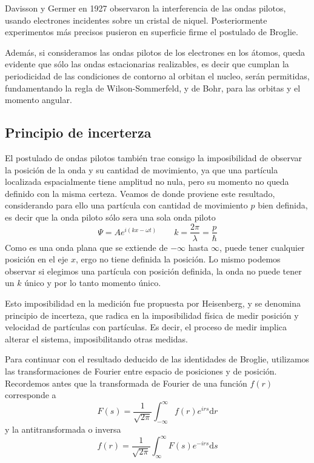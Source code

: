 Davisson y Germer en 1927 observaron la interferencia de las ondas pilotos, usando electrones incidentes sobre un cristal de niquel.
Posteriormente experimentos más precisos pusieron en superficie firme el postulado de Broglie.

Además, si consideramos las ondas pilotos de los electrones en los átomos, queda evidente que sólo las ondas estacionarias realizables, es decir que cumplan la periodicidad de las condiciones de contorno al orbitan el nucleo, serán permitidas, fundamentando la regla de Wilson-Sommerfeld, y de Bohr, para las orbitas y el momento angular.

\subsection{Principio de incerterza}
El postulado de ondas pilotos también trae consigo la imposibilidad de observar la posición de la onda y su cantidad de movimiento, ya que una partícula localizada espacialmente tiene amplitud no nula, pero su momento no queda definido con la misma certeza.
Veamos de donde proviene este resultado, considerando para ello una partícula con cantidad de movimiento $p$ bien definida, es decir que la onda piloto sólo sera una sola onda piloto
\[ \Psi = A e^{i (k x - \omega t)} \qquad k = \frac{2\pi}{\lambda} = \frac{p}{\hbar}\]
Como es una onda plana que se extiende de $-\infty$ hasta $\infty$, puede tener cualquier posición en el eje $x$, ergo no tiene definida la posición.
Lo mismo podemos observar si elegimos una partícula con posición definida, la onda no puede tener un $k$ único y por lo tanto momento único.

Esto imposibilidad en la medición fue propuesta por Heisenberg, y se denomina principio de incerteza, que radica en la imposibilidad física de medir posición y velocidad de partículas con partículas.
Es decir, el proceso de medir implica alterar el sistema, imposibilitando otras medidas.

Para continuar con el resultado deducido de las identidades de Broglie, utilizamos las transformaciones de Fourier entre espacio de posiciones y de posición.
Recordemos antes que la transformada de Fourier de una función $f(r)$ corresponde a
\begin{equation}
    F(s) = \frac{1}{\sqrt{2\pi}} \int_{-\infty}^{\infty} f(r) e^{i r s} \mathrm{d}r
\end{equation}
y la antitransformada o inversa
\begin{equation}
    f(r) = \frac{1}{\sqrt{2\pi}} \int_{\infty}^{\infty} F(s) e^{- i r s} \mathrm{d}s
\end{equation}

